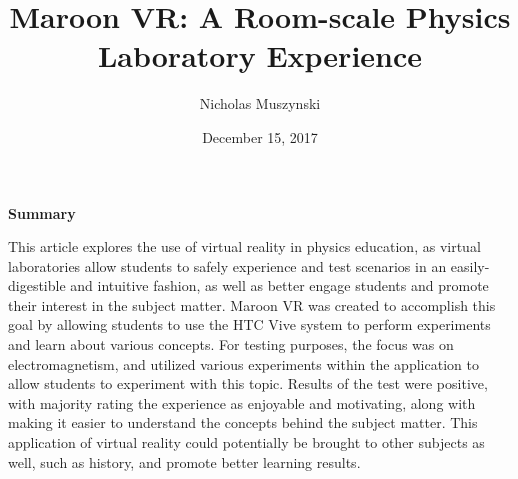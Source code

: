 \documentclass{article}
\begin{document}
\title{Maroon VR: A Room-scale Physics Laboratory Experience}
\author{Nicholas Muszynski}
\date{December 15, 2017}

\maketitle

\textbf{Summary}
\newline

This article explores the use of virtual reality in physics education, as virtual laboratories allow students to safely experience and test scenarios in an easily-digestible and intuitive fashion, as well as better engage students and promote their interest in the subject matter. Maroon VR was created to accomplish this goal by allowing students to use the HTC Vive system to perform experiments and learn about various concepts. For testing purposes, the focus was on electromagnetism, and utilized various experiments within the application to allow students to experiment with this topic. Results of the test were positive, with majority rating the experience as enjoyable and motivating, along with making it easier to understand the concepts behind the subject matter. This application of virtual reality could potentially be brought to other subjects as well, such as history, and promote better learning results.

\nocite{physicsCite}



\end{document}
